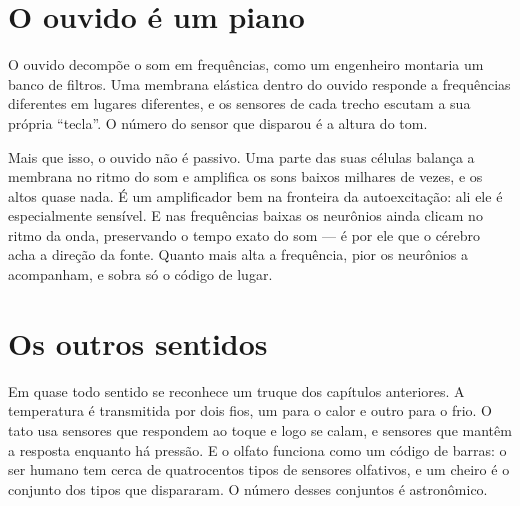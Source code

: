 \section*{O ouvido é um piano}

O ouvido decompõe o som em frequências, como um engenheiro montaria um banco de filtros. Uma membrana elástica dentro do ouvido responde a frequências diferentes em lugares diferentes, e os sensores de cada trecho escutam a sua própria ``tecla''. O número do sensor que disparou é a altura do tom.


Mais que isso, o ouvido não é passivo. Uma parte das suas células balança a membrana no ritmo do som e amplifica os sons baixos milhares de vezes, e os altos quase nada. É um amplificador bem na fronteira da autoexcitação: ali ele é especialmente sensível. E nas frequências baixas os neurônios ainda clicam no ritmo da onda, preservando o tempo exato do som --- é por ele que o cérebro acha a direção da fonte. Quanto mais alta a frequência, pior os neurônios a acompanham, e sobra só o código de lugar.

\section*{Os outros sentidos}

Em quase todo sentido se reconhece um truque dos capítulos anteriores. A temperatura é transmitida por dois fios, um para o calor e outro para o frio. O tato usa sensores que respondem ao toque e logo se calam, e sensores que mantêm a resposta enquanto há pressão. E o olfato funciona como um código de barras: o ser humano tem cerca de quatrocentos tipos de sensores olfativos, e um cheiro é o conjunto dos tipos que dispararam. O número desses conjuntos é astronômico.

